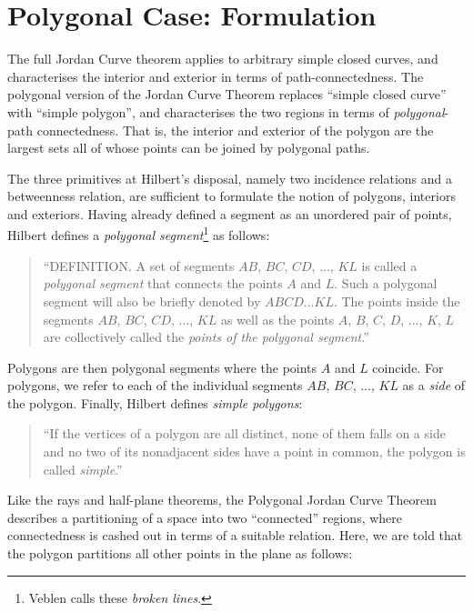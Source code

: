 \section{Polygonal Case: Formulation}\label{sec:JordanCurveExplanation}
The full Jordan Curve theorem applies to arbitrary simple closed curves, and characterises the interior and exterior in terms of path-connectedness. The polygonal version of the Jordan Curve Theorem replaces ``simple closed curve'' with ``simple polygon'', and characterises the two regions in terms of \emph{polygonal}-path connectedness. That is, the interior and exterior of the polygon are the largest sets all of whose points can be joined by polygonal paths. 

The three primitives at Hilbert's disposal, namely two incidence relations and a betweenness relation, are sufficient to formulate the notion of polygons, interiors and exteriors. Having already defined a segment as an unordered pair of points, Hilbert defines a \emph{polygonal segment}\footnote{Veblen calls these \emph{broken lines}.} as follows:

\begin{quote}
``DEFINITION. A set of segments $AB$, $BC$, $CD$, $\ldots$, $KL$ is called a \emph{polygonal segment} that connects the points $A$ and $L$. Such a polygonal segment will also be briefly denoted by $ABCD\ldots KL$. The points inside the segments $AB$, $BC$, $CD$, $\ldots$, $KL$ as well as the points $A$, $B$, $C$, $D$, $\ldots$, $K$, $L$ are collectively called the \emph{points of the polygonal segment}.''
\end{quote}

Polygons are then polygonal segments where the points $A$ and $L$ coincide. For polygons, we refer to each of the individual segments $AB$, $BC$, $\ldots$, $KL$ as a \emph{side} of the polygon. Finally, Hilbert defines \emph{simple polygons}:

\begin{quote}
``If the vertices of a polygon are all distinct, none of them falls on a side and no two of its nonadjacent sides have a point in common, the polygon is called \emph{simple}.''
\end{quote}

Like the rays and half-plane theorems, the Polygonal Jordan Curve Theorem describes a partitioning of a space into two ``connected'' regions, where connectedness is cashed out in terms of a suitable relation. Here, we are told that the polygon partitions all other points in the plane as follows:

